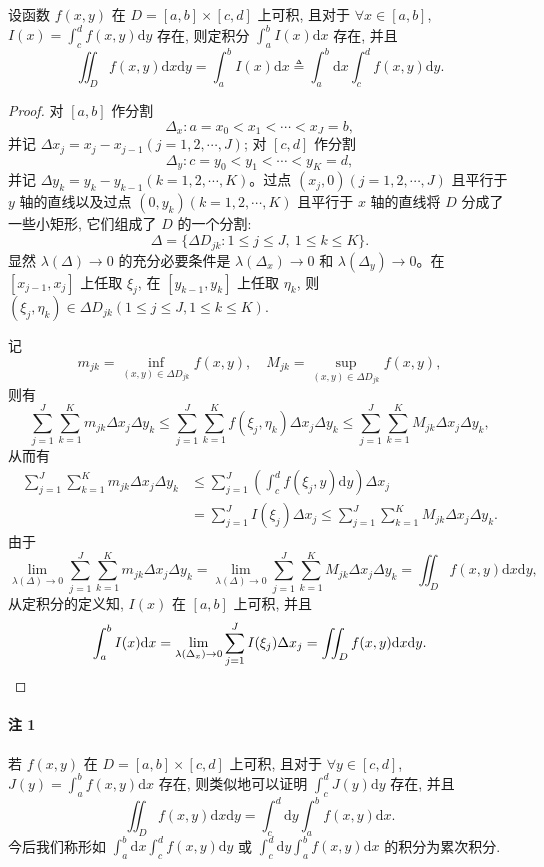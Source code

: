 \begin{theorem}\label{theorem:ma-15-3-1}
设函数 $f(x,y)$ 在 $D=[a,b]\times[c,d]$ 上可积, 且对于 $\forall x\in[a,b]$, $I(x)=\int_c^d f(x,y)\mathrm dy$ 存在, 则定积分 $\int_a^b I(x)\mathrm dx$ 存在, 并且
\[
  \iint_D f(x,y)\mathrm dx\mathrm dy
  =\int_a^b I(x)\mathrm dx
  \triangleq\int_a^b\mathrm dx\int_c^d f(x,y)\mathrm dy.
\]
\end{theorem}


\begin{proof}
对 $[a,b]$ 作分割
\[
  \Delta_x:a=x_0<x_1<\cdots<x_J=b,
\]
并记 $\Delta x_j=x_j-x_{j-1}(j=1,2,\cdots,J)$; 对 $[c,d]$ 作分割
\[
  \Delta_y:c=y_0<y_1<\cdots<y_K=d,
\]
并记 $\Delta y_k=y_k-y_{k-1}(k=1,2,\cdots,K)$。过点 $(x_j,0)(j=1,2,\cdots,J)$ 且平行于 $y$ 轴的直线以及过点 $(0,y_k)(k=1,2,\cdots,K)$ 且平行于 $x$ 轴的直线将 $D$ 分成了一些小矩形, 它们组成了 $D$ 的一个分割:
\[
  \Delta=\{\Delta D_{jk}:1\leqslant j\leqslant J,\ 1\leqslant k\leqslant K\}.
\]
显然 $\lambda(\Delta)\to0$ 的充分必要条件是 $\lambda(\Delta_x)\to0$ 和 $\lambda(\Delta_y)\to0$。在 $[x_{j-1},x_j]$ 上任取 $\xi_j$, 在 $[y_{k-1},y_k]$ 上任取 $\eta_k$, 则 $(\xi_j,\eta_k)\in\Delta D_{jk}(1\leqslant j\leqslant J,1\leqslant k\leqslant K)$.

记
\[
  m_{jk}=\inf_{(x,y)\in\Delta D_{jk}}f(x,y),\quad
  M_{jk}=\sup_{(x,y)\in\Delta D_{jk}}f(x,y),
\]
则有
\[
  \sum_{j=1}^J\sum_{k=1}^K m_{jk}\Delta x_j\Delta y_k
  \leqslant \sum_{j=1}^J\sum_{k=1}^K f(\xi_j,\eta_k)\Delta x_j\Delta y_k
  \leqslant \sum_{j=1}^J\sum_{k=1}^K M_{jk}\Delta x_j\Delta y_k,
\]
从而有
\[
\begin{aligned}
  \sum_{j=1}^J\sum_{k=1}^K m_{jk}\Delta x_j\Delta y_k
  &\leqslant \sum_{j=1}^J\left(\int_c^d f(\xi_j,y)\mathrm dy\right)\Delta x_j\\
  &=\sum_{j=1}^J I(\xi_j)\Delta x_j
  \leqslant \sum_{j=1}^J\sum_{k=1}^K M_{jk}\Delta x_j\Delta y_k.
\end{aligned}
\]
由于
\[
  \lim_{\lambda(\Delta)\to0}\sum_{j=1}^J\sum_{k=1}^K m_{jk}\Delta x_j\Delta y_k
  =
  \lim_{\lambda(\Delta)\to0}\sum_{j=1}^J\sum_{k=1}^K M_{jk}\Delta x_j\Delta y_k
  =
  \iint_D f(x,y)\mathrm dx\mathrm dy,
\]
从定积分的定义知, $I(x)$ 在 $[a,b]$ 上可积, 并且
\[
  \int_a^b I(x)\mathrm dx
  =
  \lim_{\lambda(\Delta_x)\to0}\sum_{j=1}^J I(\xi_j)\Delta x_j
  =
  \iint_D f(x,y)\mathrm dx\mathrm dy.
\qedhere
\]
\end{proof}


\paragraph*{注 1}
若 $f(x,y)$ 在 $D=[a,b]\times[c,d]$ 上可积, 且对于 $\forall y\in[c,d]$, $J(y)=\int_a^b f(x,y)\mathrm dx$ 存在, 则类似地可以证明 $\int_c^d J(y)\mathrm dy$ 存在, 并且
\[
  \iint_D f(x,y)\mathrm dx\mathrm dy
  =
  \int_c^d\mathrm dy\int_a^b f(x,y)\mathrm dx.
\]
今后我们称形如 $\int_a^b\mathrm dx\int_c^d f(x,y)\mathrm dy$ 或 $\int_c^d\mathrm dy\int_a^b f(x,y)\mathrm dx$ 的积分为累次积分.

